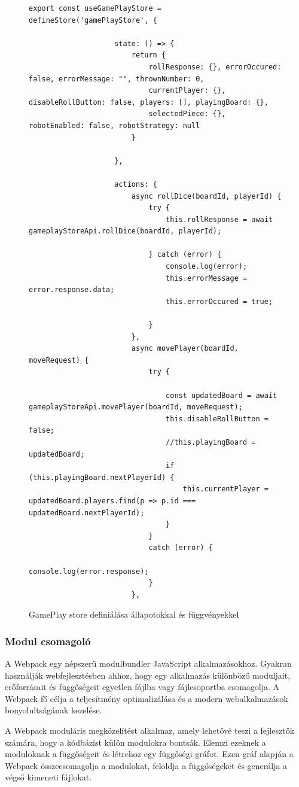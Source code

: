 \documentclass[a4paper,twoside]{article}
\begin{document}
\begin{figure}
	\caption{GamePlay store definiálása állapotokkal és függvényekkel}
	
		\begin{minipage}{\textwidth}
			\begin{lstlisting}[style=javascriptStyle]
				export const useGamePlayStore = defineStore('gamePlayStore', {
					
					state: () => {
						return {
							rollResponse: {}, errorOccured: false, errorMessage: "", thrownNumber: 0,
							currentPlayer: {}, disableRollButton: false, players: [], playingBoard: {},
							selectedPiece: {}, robotEnabled: false, robotStrategy: null
						}
						
					},
					
					actions: {
						async rollDice(boardId, playerId) {
							try {
								this.rollResponse = await gameplayStoreApi.rollDice(boardId, playerId);
								
							} catch (error) {
								console.log(error);
								this.errorMessage = error.response.data;
								this.errorOccured = true;
								
							}
						},
						async movePlayer(boardId, moveRequest) {
							try {
								
								const updatedBoard = await gameplayStoreApi.movePlayer(boardId, moveRequest);
								this.disableRollButton = false;
								//this.playingBoard = updatedBoard;
								if (this.playingBoard.nextPlayerId) {
									this.currentPlayer = updatedBoard.players.find(p => p.id === updatedBoard.nextPlayerId);
								}
							}
							catch (error) {
								console.log(error.response);
							}
						},
			\end{lstlisting}
		\end{minipage}
	
	\label{pinia}
\end{figure}
\subsubsection{Modul csomagoló}

A Webpack\cite{webpack} egy népszerű modulbundler JavaScript alkalmazásokhoz. Gyakran
használják webfejlesztésben ahhoz, hogy egy alkalmazás különböző moduljait,
erőforrásait és függőségeit egyetlen fájlba vagy fájlcsoportba csomagolja. A Webpack fő
célja a teljesítmény optimalizálása és a modern webalkalmazások bonyolultságának
kezelése.

A Webpack moduláris megközelítést alkalmaz, amely lehetővé teszi a fejlesztők számára,
hogy a kódbázist külön modulokra bontsák. Elemzi ezeknek a moduloknak a függőségeit
és létrehoz egy függőségi gráfot. Ezen gráf alapján a Webpack összecsomagolja a
modulokat, feloldja a függőségeket és generálja a végső kimeneti fájlokat.
\end{document}
